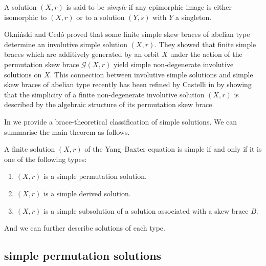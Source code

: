 \begin{definition}
    A solution $(X,r)$ is said to be \emph{simple} if any epimorphic image is either isomorphic to $(X,r)$ or to a solution $(Y,s)$ with $Y$ a singleton. 
\end{definition}


    Okni\'nski and Ced\'o \cite{CeOkn} proved that some finite simple skew  braces of abelian type determine an involutive
    simple solution $(X,r)$. They showed that finite simple braces which are additively generated by an orbit $X$ under the action
    of the permutation skew  brace $\mathcal{G}(X,r)$ yield simple non-degenerate involutive solutions on $X$. This connection
    between involutive simple solutions and simple skew  braces of abelian type recently has been refined by Castelli in
    \cite{Cast22} by showing that the simplicity of a finite non-degenerate involutive solution $(X,r)$ is described by the
    algebraic structure of its permutation skew brace.

    In \cite{simple} we provide a brace-theoretical classification of simple solutions.
    We can summarise the main theorem as follows.
    
    \begin{theorem}
        A finite solution $(X,r)$ of the Yang--Baxter equation is simple if and only if
    it is one of the following types: 
    \begin{enumerate}
        \item $(X,r)$ is a simple permutation solution.
        \item $(X,r)$ is a simple derived solution.
        \item $(X,r)$ is a simple subsolution of a solution associated with a skew  brace $B$.
    \end{enumerate}
    \end{theorem}

    And we can further describe solutions of each type. 

    \subsection{simple permutation solutions}

    

